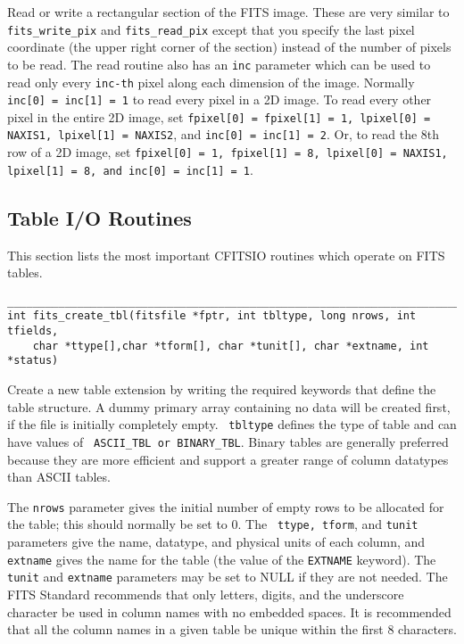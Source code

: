 \documentclass[11pt]{article}
\begin{document}
Read or write a rectangular section of the FITS image.  These are very
similar to {\tt fits\_write\_pix} and {\tt fits\_read\_pix} except that
you specify the last pixel coordinate (the upper right corner of the
section) instead of the number of pixels to be read.  The read routine
also has an {\tt inc} parameter which can be used to read only every
{\tt inc-th} pixel along each dimension of the image.  Normally  {\tt
inc[0] = inc[1] = 1} to read every pixel in a 2D image.  To read every
other pixel in the entire 2D image, set {\tt fpixel[0] = fpixel[1] = 1,
lpixel[0] = NAXIS1, lpixel[1] = NAXIS2}, and {\tt inc[0] = inc[1] =
2}.  Or, to read the 8th row of a 2D image, set {\tt fpixel[0] = 1,
fpixel[1] = 8, lpixel[0] = NAXIS1, lpixel[1] = 8, and inc[0] = inc[1] =
1}.

\newpage
\subsection{Table I/O Routines}

This section lists the most important CFITSIO routines which operate on
FITS tables.

\begin{verbatim}
__________________________________________________________________________
int fits_create_tbl(fitsfile *fptr, int tbltype, long nrows, int tfields,
    char *ttype[],char *tform[], char *tunit[], char *extname, int *status)
\end{verbatim}

Create a new  table extension by writing the required keywords that
define the table structure. A dummy primary array containing no data
will be created first, if the file is initially completely empty.  {\tt
tbltype} defines the type of table and can have values of {\tt
ASCII\_TBL or BINARY\_TBL}.  Binary tables are generally preferred
because they are more efficient and support a greater range of column
datatypes than ASCII tables.

The {\tt nrows} parameter gives the initial number of empty rows to be
allocated for the table; this should normally be set to 0.  The {\tt
ttype, tform}, and {\tt tunit} parameters give the name, datatype, and
physical units of each column, and {\tt extname} gives the name for the
table (the value of the {\tt EXTNAME} keyword). The {\tt
tunit} and {\tt extname} parameters may be set to NULL
if they are not needed.  The FITS Standard recommends that only
letters, digits, and the underscore character be used in column names
with no embedded spaces.  It is recommended that all the column names
in a given table be unique within the first 8 characters.
\end{document}
